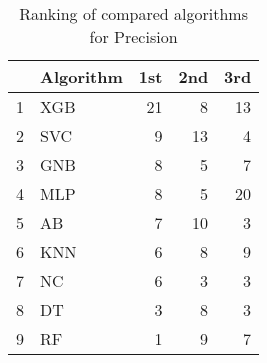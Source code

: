 \begin{table}
\footnotesize
\caption{Ranking of compared algorithms for Precision}
\label{tab:places Precision}
\begin{tabular}{llrrr}
\hline
 & Algorithm & 1st & 2nd & 3rd \\
\hline
1 & XGB & 21 & 8 & 13 \\
2 & SVC & 9 & 13 & 4 \\
3 & GNB & 8 & 5 & 7 \\
4 & MLP & 8 & 5 & 20 \\
5 & AB & 7 & 10 & 3 \\
6 & KNN & 6 & 8 & 9 \\
7 & NC & 6 & 3 & 3 \\
8 & DT & 3 & 8 & 3 \\
9 & RF & 1 & 9 & 7 \\
\hline
\end{tabular}
\end{table}
